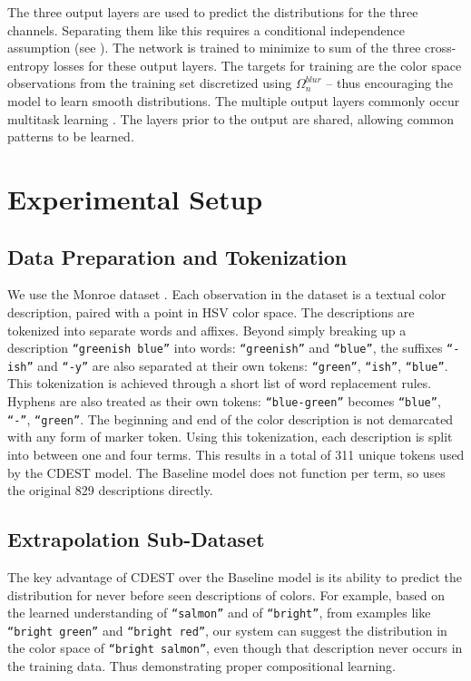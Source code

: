 \documentclass[11pt,letterpaper]{article}
\newcommand{\parencite}{\cite}
\begin{document}
The three output layers are used to predict the distributions for the three channels.
Separating them like this requires a conditional independence assumption (see ).
The network is trained to minimize to sum of the three cross-entropy losses for these output layers.
The targets for training are the color space observations from the training set discretized using $\Omega_n^{blur}$ -- thus encouraging the model to learn smooth distributions.
The multiple output layers commonly occur multitask learning \parencite{caruana1997multitask,collobert2008unified}.
The layers prior to the output are shared, allowing common patterns to be learned.


\section{Experimental Setup}\label{sec:experimental-setup}
\subsection{Data Preparation and Tokenization}\label{sec:data-preparation}
We use the Monroe dataset \parencite{Monroe2010XKCDdataset,mcmahan2015bayesian}.
Each observation in the dataset is a textual color description, paired with a point in HSV color space.
The descriptions are tokenized into separate words and affixes.
Beyond simply breaking up a description \texttt{``greenish blue''} into words: \texttt{``greenish''} and \texttt{``blue''}, the suffixes \texttt{``-ish''} and \texttt{``-y''} are also separated at their own tokens: \texttt{``green''}, \texttt{``ish''}, \texttt{``blue''}.
This tokenization is achieved through a short list of word replacement rules.
Hyphens are also treated as their own tokens: \texttt{``blue-green''} becomes \texttt{``blue''}, \texttt{``-''}, \texttt{``green''}.
The beginning and end of the color description is not demarcated with any form of marker token.
Using this tokenization, each description is split into between one and four terms.
This results in a total of 311 unique tokens used by the CDEST model.
The Baseline model does not function per term, so uses the original 829 descriptions directly.


\subsection{Extrapolation Sub-Dataset}
The key advantage of CDEST over the Baseline model is its ability to predict the distribution for never before seen descriptions of colors.
For example, based on the learned understanding of \texttt{``salmon''} and of \texttt{``bright''}, from examples like \texttt{``bright green''} and \texttt{``bright red''}, our system can suggest the distribution in the color space of \texttt{``bright salmon''}, even though that description never occurs in the training data.
Thus demonstrating proper compositional learning.
\end{document}
